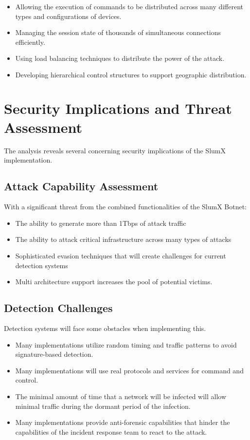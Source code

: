 \documentclass[12pt,letterpaper]{report}
\begin{document}
\begin{itemize}
    \item Allowing the execution of commands to be distributed across many different types and configurations of devices. 
    \item Managing the session state of thousands of simultaneous connections efficiently. 
    \item Using load balancing techniques to distribute the power of the attack. 
    \item Developing hierarchical control structures to support geographic distribution. 
\end{itemize}

\section{Security Implications and Threat Assessment}

The analysis reveals several concerning security implications of the SlumX implementation.

\subsection{Attack Capability Assessment}

With a significant threat from the combined functionalities of the SlumX Botnet: 

\begin{itemize}
    \item The ability to generate more than 1Tbps of attack traffic 
    \item The ability to attack critical infrastructure across many types of attacks  
    \item Sophisticated evasion techniques that will create challenges for current detection systems 
    \item Multi architecture support increases the pool of potential victims. 
\end{itemize}

\subsection{Detection Challenges}

Detection systems will face some obstacles when implementing this. 

\begin{itemize}
    \item Many implementations utilize random timing and traffic patterns to avoid signature-based detection. 
    \item Many implementations will use real protocols and services for command and control. 
    \item The minimal amount of time that a network will be infected will allow minimal traffic during the dormant period of the infection.
    \item Many implementations provide anti-forensic capabilities that hinder the capabilities of the incident response team to react to the attack. 
\end{itemize}
\end{document}
